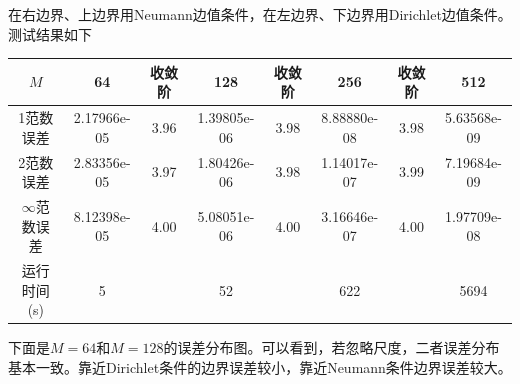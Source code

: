 \documentclass[lang=cn,10pt,bibend=bibtex]{elegantbook}
\begin{document}
在右边界、上边界用Neumann边值条件，在左边界、下边界用Dirichlet边值条件。测试结果如下

\begin{table}[H]
  \centering
  \small
  \begin{tabular}{c|ccccccc}
  \textbf{$M$}              & 64          & 收敛阶 & 128         & 收敛阶 & 256         & 收敛阶 & 512   \\ \hline
  1范数误差                  & 2.17966e-05 & 3.96  & 1.39805e-06 & 3.98  & 8.88880e-08 & 3.98  & 5.63568e-09 \\
  2范数误差                  & 2.83356e-05 & 3.97  & 1.80426e-06 & 3.98  & 1.14017e-07 & 3.99  & 7.19684e-09 \\
  $\infty$范数误差           & 8.12398e-05 & 4.00  & 5.08051e-06 & 4.00  & 3.16646e-07 & 4.00  & 1.97709e-08 \\
  运行时间(s)                & 5           &       & 52          &       & 622         &       & 5694
  \end{tabular}
\end{table}

下面是$M=64$和$M=128$的误差分布图。可以看到，若忽略尺度，二者误差分布基本一致。靠近Dirichlet条件的边界误差较小，靠近Neumann条件边界误差较大。
\end{document}
